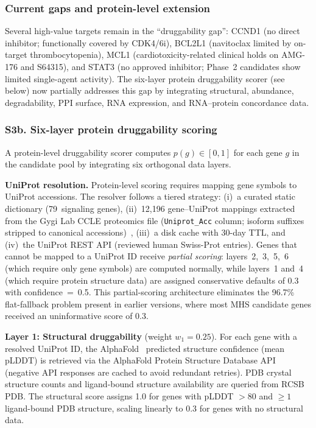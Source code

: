 \documentclass[11pt]{article}
\begin{document}
\subsubsection*{Current gaps and protein-level extension}
Several high-value targets remain in the ``druggability gap'': CCND1 (no direct inhibitor; functionally covered by CDK4/6i), BCL2L1 (navitoclax limited by on-target thrombocytopenia), MCL1 (cardiotoxicity-related clinical holds on AMG-176 and S64315), and STAT3 (no approved inhibitor; Phase~2 candidates show limited single-agent activity). The six-layer protein druggability scorer (see below) now partially addresses this gap by integrating structural, abundance, degradability, PPI surface, RNA expression, and RNA--protein concordance data.

\subsubsection*{S3b. Six-layer protein druggability scoring}
A protein-level druggability scorer computes $p(g) \in [0,1]$ for each gene $g$ in the candidate pool by integrating six orthogonal data layers.

\textbf{UniProt resolution.} Protein-level scoring requires mapping gene symbols to UniProt accessions. The resolver follows a tiered strategy: (i)~a curated static dictionary (79~signaling genes), (ii)~12{,}196 gene--UniProt mappings extracted from the Gygi Lab CCLE proteomics file (\texttt{Uniprot\_Acc} column; isoform suffixes stripped to canonical accessions)~\cite{Nusinow2020}, (iii)~a disk cache with 30-day TTL, and (iv)~the UniProt REST API (reviewed human Swiss-Prot entries). Genes that cannot be mapped to a UniProt ID receive \emph{partial scoring}: layers~2,~3,~5,~6 (which require only gene symbols) are computed normally, while layers~1 and~4 (which require protein structure data) are assigned conservative defaults of 0.3 with confidence~=~0.5. This partial-scoring architecture eliminates the 96.7\% flat-fallback problem present in earlier versions, where most MHS candidate genes received an uninformative score of 0.3.

\textbf{Layer 1: Structural druggability} (weight $w_1 = 0.25$). For each gene with a resolved UniProt ID, the AlphaFold~\cite{Jumper2021} predicted structure confidence (mean pLDDT) is retrieved via the AlphaFold Protein Structure Database API (negative API responses are cached to avoid redundant retries). PDB crystal structure counts and ligand-bound structure availability are queried from RCSB PDB. The structural score assigns 1.0 for genes with pLDDT $> 80$ and $\geq 1$ ligand-bound PDB structure, scaling linearly to 0.3 for genes with no structural data.
\end{document}
